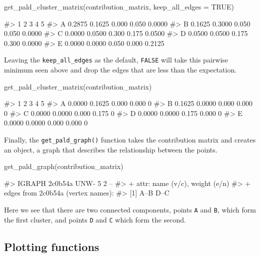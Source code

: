\begin{Schunk}
\begin{Sinput}
get_pald_cluster_matrix(contribution_matrix, keep_all_edges = TRUE)
\end{Sinput}
\begin{Soutput}
#>        1      2     3     4      5
#> A 0.2875 0.1625 0.000 0.050 0.0000
#> B 0.1625 0.3000 0.050 0.050 0.0000
#> C 0.0000 0.0500 0.300 0.175 0.0500
#> D 0.0500 0.0500 0.175 0.300 0.0000
#> E 0.0000 0.0000 0.050 0.000 0.2125
\end{Soutput}
\end{Schunk}

Leaving the \texttt{keep\_all\_edges} as the default, \texttt{FALSE}
will take this pairwise minimum seen above and drop the edges that are
less than the expectation.

\begin{Schunk}
\begin{Sinput}
get_pald_cluster_matrix(contribution_matrix)
\end{Sinput}
\begin{Soutput}
#>        1      2     3     4 5
#> A 0.0000 0.1625 0.000 0.000 0
#> B 0.1625 0.0000 0.000 0.000 0
#> C 0.0000 0.0000 0.000 0.175 0
#> D 0.0000 0.0000 0.175 0.000 0
#> E 0.0000 0.0000 0.000 0.000 0
\end{Soutput}
\end{Schunk}

Finally, the \texttt{get\_pald\_graph()} function takes the contribution
matrix and creates an  object, a graph that describes
the relationship between the points.

\begin{Schunk}
\begin{Sinput}
get_pald_graph(contribution_matrix)
\end{Sinput}
\begin{Soutput}
#> IGRAPH 2c0b54a UNW- 5 2 -- 
#> + attr: name (v/c), weight (e/n)
#> + edges from 2c0b54a (vertex names):
#> [1] A--B D--C
\end{Soutput}
\end{Schunk}

Here we see that there are two connected components, points \texttt{A}
and \texttt{B}, which form the first cluster, and points \texttt{D} and
\texttt{C} which form the second.

\hypertarget{plotting-functions}{%
\subsection{Plotting functions}\label{plotting-functions}}

